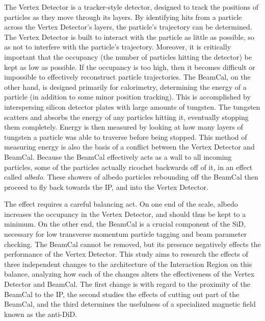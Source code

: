 \documentclass{report}
\begin{document}
                The Vertex Detector is a tracker-style detector, designed to track the positions of particles as they move through its layers. By identifying hits from a particle across the Vertex Detector's layers, the particle's trajectory can be determined. The Vertex Detector is built to interact with the particle as little as possible, so as not to interfere with the particle's trajectory. Moreover, it is critically important that the occupancy (the number of particles hitting the detector) be kept as low as possible. If the occupancy is too high, then it becomes difficult or impossible to effectively reconstruct particle trajectories. The BeamCal, on the other hand, is designed primarily for calorimetry, determining the energy of a particle (in addition to some minor position tracking). This is accomplished by interspersing silicon detector plates with large amounts of tungsten. The tungsten scatters and absorbs the energy of any particles hitting it, eventually stopping them completely. Energy is then measured by looking at how many layers of tungsten a particle was able to traverse before being stopped. This method of measuring energy is also the basis of a conflict between the Vertex Detector and BeamCal. Because the BeamCal effectively acts as a wall to all incoming particles, some of the particles actually ricochet backwards off of it, in an effect called \textit{albedo}. These showers of albedo particles rebounding off the BeamCal then proceed to fly back towards the IP, and into the Vertex Detector.
                
                The effect requires a careful balancing act. On one end of the scale, albedo increases the occupancy in the Vertex Detector, and should thus be kept to a minimum. On the other end, the BeamCal is a crucial component of the SiD, necessary for low transverse momentum particle tagging and beam parameter checking. The BeamCal cannot be removed, but its presence negatively effects the performance of the Vertex Detector. This study aims to research the effects of three independent changes to the architecture of the Interaction Region on this balance, analyzing how each of the changes alters the effectiveness of the Vertex Detector and BeamCal. The first change is with regard to the proximity of the BeamCal to the IP, the second studies the effects of cutting out part of the BeamCal, and the third determines the usefulness of a specialized magnetic field known as the anti-DiD.
\end{document}
